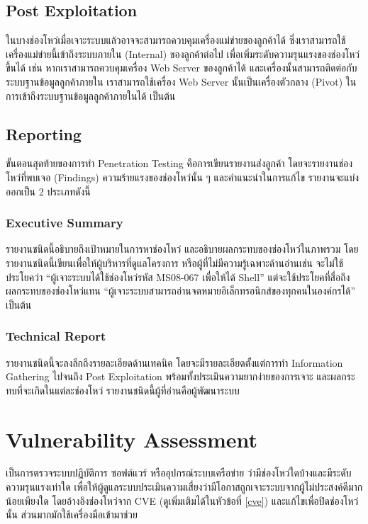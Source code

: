 \subsection{Post Exploitation}

ในบางช่องโหว่เมื่อเจาะระบบแล้วอาจจะสามารถควบคุมเครื่องแม่ข่ายของลูกค้าได้ ซึ่งเราสามารถใช้เครื่องแม่ข่ายนี้เข้าถึงระบบภายใน (Internal)\cite{???}  ของลูกค้าต่อไป เพื่อเพิ่มระดับความรุนแรงของช่องโหว่ขึ้นได้ เช่น หากเราสามารถควบคุมเครื่อง Web Server ของลูกค้าได้ และเครื่องนั้นสามารถติดต่อกับระบบฐานข้อมูลลูกค้าภายใน เราสามารถใช้เครื่อง Web Server นั้นเป็นเครื่องตัวกลาง (Pivot)\cite{???} ในการเข้าถึงระบบฐานข้อมูลลูกค้าภายในได้ เป็นต้น

\subsection{Reporting}

ขั้นตอนสุดท้ายของการทำ Penetration Testing คือการเขียนรายงานส่งลูกค้า โดยจะรายงานช่องโหว่ที่พบเจอ (Findings) ความร้ายแรงของช่องโหว่นั้น ๆ และคำแนะนำในการแก้ไข
รายงานจะแบ่งออกเป็น 2 ประเภทดังนี้

\subsubsection{Executive Summary}

รายงานชนิดนี้อธิบายถึงเป้าหมายในการหาช่องโหว่ และอธิบายผลกระทบของช่องโหว่ในภาพรวม โดยรายงานชนิดนี้เขียนเพื่อให้ผู้บริหารที่ดูแลโครงการ หรือผู้ที่ไม่มีความรู้เฉพาะด้านอ่านเช่น จะไม่ใช้ประโยคว่า “ผู้เจาะระบบได้ใช้ช่องโหว่รหัส MS08-067 เพื่อให้ได้ Shell” แต่จะใช้ประโยคที่สื่อถึงผลกระทบของช่องโหว่แทน “ผู้เจาะระบบสามารถอ่านจดหมายอิเล็กทรอนิกส์ของทุกคนในองค์กรได้” เป็นต้น

\subsubsection{Technical Report}

รายงานชนิดนี้จะลงลึกถึงรายละเอียดด้านเทคนิค โดยจะมีรายละเอียดตั้งแต่การทำ Information Gathering ไปจนถึง Post Exploitation พร้อมทั้งประเมินความยากง่ายของการเจาะ และผลกระทบที่จะเกิดในแต่ละช่องโหว่ รายงานชนิดนี้ผู้ที่อ่านคือผู้พัฒนาระบบ

\section{Vulnerability Assessment}

เป็นการตรวจระบบปฏิบัติการ ซอฟต์แวร์ หรืออุปกรณ์ระบบเครือข่าย ว่ามีช่องโหว่ใดบ้างและมีระดับความรุนแรงเท่าใด เพื่อให้ผู้ดูแลระบบประเมินความเสี่ยงว่ามีโอกาสถูกเจาะระบบจากผู้ไม่ประสงค์ดีมากน้อยเพียงใด โดยอ้างอิงช่องโหว่จาก CVE (ดูเพิ่มเติมได้ในหัวข้อที่ \ref{cve}) และแก้ไขเพื่อปิดช่องโหว่นั้น ส่วนมากมักใช้เครื่องมือเข้ามาช่วย 

